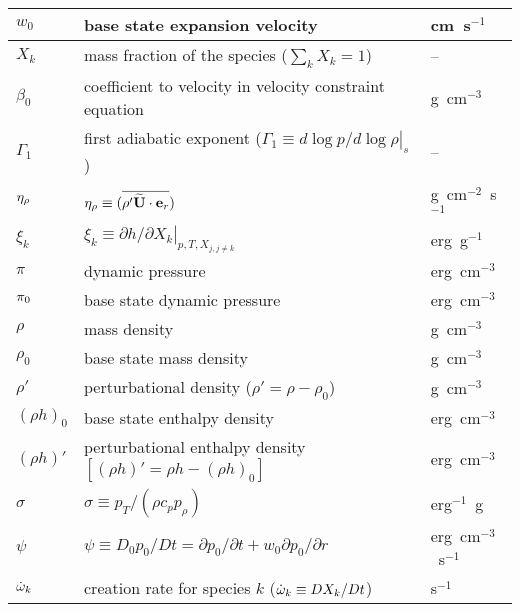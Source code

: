 \begin{center}
\begin{longtable}{|l|p{4.0in}|l|}
\hline
$w_0$   & base state expansion velocity              & cm~s$^{-1}$ \\
\hline
$X_k$   & mass fraction of the species ($\sum_k X_k = 1$) & -- \\
\hline
$\beta_0$ & coefficient to velocity
            in velocity constraint equation  & g~cm$^{-3}$ \\
\hline
$\Gamma_1$ & first adiabatic exponent ($\Gamma_1 \equiv \left . d \log p/d \log \rho \right |_s$) & -- \\
\hline
$\eta_{\rho}$ & $\eta_{\rho} \equiv (\overline{ \rho' \widetilde{{\bf U}} \cdot \mathbf{e}_r})$ & g~cm$^{-2}$~s$^{-1}$ \\
\hline
$\xi_k$ & $\xi_k \equiv \left . \partial h / \partial X_k \right |_{p,T,X_{j,j\ne k}}$ & erg~g$^{-1}$ \\
\hline 
$\pi$   & dynamic pressure & erg~cm$^{-3}$ \\
\hline
$\pi_0$ & base state dynamic pressure & erg~cm$^{-3}$ \\
\hline
$\rho$  & mass density  & g~cm$^{-3}$ \\
\hline
$\rho_0$  & base state mass density  & g~cm$^{-3}$ \\
\hline
$\rho'$  & perturbational density ($\rho' = \rho - \rho_0$) & g~cm$^{-3}$ \\
\hline
$(\rho h)_0$ & base state enthalpy density & erg~cm$^{-3}$  \\
\hline
$(\rho h)'$ & perturbational enthalpy density 
              $ \left [(\rho h)' = \rho h - (\rho h)_0 \right ]$ & erg~cm$^{-3}$  \\
\hline
$\sigma$ & $\sigma \equiv p_T/(\rho c_p p_\rho)$ & erg$^{-1}$~g \\
\hline
$\psi$  & $\psi \equiv D_0 p_0/Dt = \partial p_0/\partial t + w_0\partial p_0/\partial r$ & erg~cm$^{-3}$~s$^{-1}$ \\
\hline
$\dot{\omega}_k$ & creation rate for species $k$ ($\dot{\omega}_k \equiv DX_k/Dt$) & s$^{-1}$ \\
\end{longtable}
\end{center}
%
\renewcommand{\arraystretch}{1.0}


